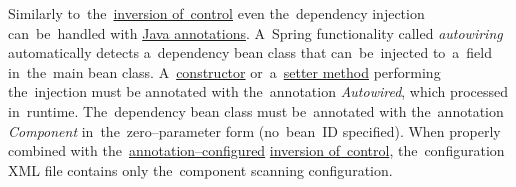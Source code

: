 \label{autowiring}
Similarly to~the~\hyperref[inversionofcontrol]{inversion of~control} even the~dependency injection can~be~handled with \hyperref[javaannotation]{Java annotations}. A~Spring functionality called \textit{autowiring} automatically detects a~dependency bean class that can~be~injected to~a~field in~the~main bean class. A~\hyperref[constructorinjection]{constructor} or~a~\hyperref[setterinjection]{setter method} performing the~injection must be annotated with the~annotation \textit{Autowired}, which processed in~runtime. The~dependency bean class must be~annotated with the~annotation \textit{Component} in~the~zero--parameter form (no~bean~ID specified). When properly combined with the~\hyperref[iocannotations]{annotation--configured} \hyperref[inversionofcontrol]{inversion of~control}, the~configuration XML file contains only the~component scanning configuration.
\newpage

